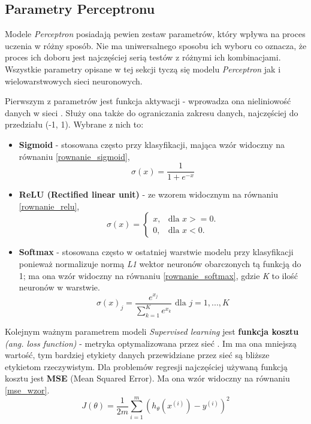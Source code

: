 \documentclass[12pt]{aghdpl}
\begin{document}
			\subsection{Parametry Perceptronu} \label{parametry_perceptronu}
			Modele \textit{Perceptron} posiadają pewien zestaw parametrów, który wpływa na proces uczenia w różny sposób. Nie ma uniwersalnego sposobu ich wyboru co oznacza, że proces ich doboru jest najczęściej serią testów z różnymi ich kombinacjami. Wszystkie parametry opisane w tej sekcji tyczą się modelu \textit{Perceptron} jak i wielowarstwowych sieci neuronowych.
			
			Pierwszym z parametrów jest funkcja aktywacji - wprowadza ona nieliniowość danych w sieci \cite{activation_functions_1}\cite{activation_functions_2}. Służy ona także do ograniczania zakresu danych, najczęściej do przedziału (-1, 1). Wybrane z nich to:
			\begin{itemize}
			
			\item\textbf{Sigmoid} - stosowana często przy klasyfikacji, mająca wzór widoczny na równaniu \ref{rownanie_sigmoid},
			\begin{equation} \label{rownanie_sigmoid}
			\sigma(x) = \frac{1}{1 + e^{-x}}
			\end{equation}
			
			\item\textbf{ReLU (Rectified linear unit)} - ze wzorem widocznym na równaniu \ref{rownanie_relu},
			\begin{equation} \label{rownanie_relu}
			\sigma(x) = 
				\begin{cases}
					x, & \text{dla } x >= 0. \\
					0, & \text{dla } x < 0.
				\end{cases}
			\end{equation}
			
			\item\textbf{Softmax} -	stosowana często w ostatniej warstwie modelu przy klasyfikacji ponieważ normalizuje normą \textit{L1} wektor neuronów obarczonych tą funkcją do 1; ma ona wzór widoczny na równaniu \ref{rownanie_softmax}, gdzie \textit{K} to ilość neuronów w warstwie.
			\begin{equation} \label{rownanie_softmax}
			\sigma(x)_j = \frac{e^{x_j}}{\sum_{k = 1}^K e^{x_k}}\text{ dla } j = 1, ..., K
			\end{equation}
			\end{itemize}
			
			Kolejnym ważnym parametrem modeli \textit{Supervised learning} jest \textbf{funkcja kosztu} \textit{(ang. loss function)} - metryka optymalizowana przez sieć \cite{cost_function_and_gradient_descent}. Im ma ona mniejszą wartość, tym bardziej etykiety danych przewidziane przez sieć są bliższe etykietom rzeczywistym. Dla problemów regresji najczęściej używaną funkcją kosztu jest \textbf{MSE} (Mean Squared Error). Ma ona wzór widoczny na równaniu \ref{mse_wzor}.
			\begin{equation} \label{mse_wzor}
			J(\theta) = \frac{1}{2m} \sum_{i = 1}^m (h_\theta(x^{(i)}) - y^{(i)})^2
			\end{equation} 
			
\end{document}
